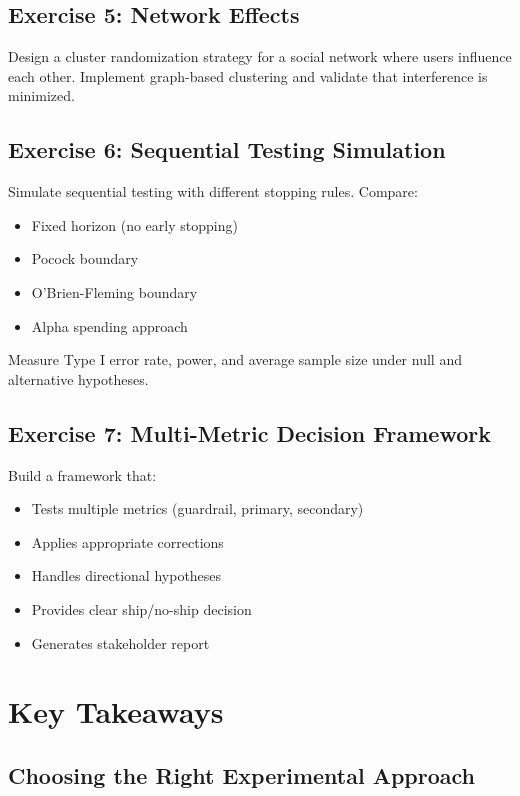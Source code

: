 \subsection{Exercise 5: Network Effects}

Design a cluster randomization strategy for a social network where users influence each other. Implement graph-based clustering and validate that interference is minimized.

\subsection{Exercise 6: Sequential Testing Simulation}

Simulate sequential testing with different stopping rules. Compare:
\begin{itemize}
    \item Fixed horizon (no early stopping)
    \item Pocock boundary
    \item O'Brien-Fleming boundary
    \item Alpha spending approach
\end{itemize}

Measure Type I error rate, power, and average sample size under null and alternative hypotheses.

\subsection{Exercise 7: Multi-Metric Decision Framework}

Build a framework that:
\begin{itemize}
    \item Tests multiple metrics (guardrail, primary, secondary)
    \item Applies appropriate corrections
    \item Handles directional hypotheses
    \item Provides clear ship/no-ship decision
    \item Generates stakeholder report
\end{itemize}

\section{Key Takeaways}

\subsection{Choosing the Right Experimental Approach}

